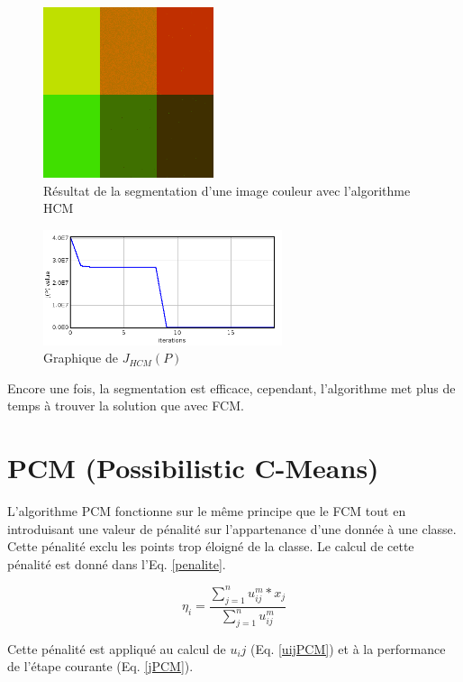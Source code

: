 \documentclass[a4paper,11pt]{article}
\begin{document}
\begin{figure}[!h]
  \begin{center}
    \includegraphics[width=5cm]{resultat/HCM.png}
    \caption{Résultat de la segmentation d'une image couleur avec l'algorithme HCM}
    \label{fig:hcm}
  \end{center}
\end{figure}

\begin{figure}[!h]
  \begin{center}
    \includegraphics[width=7cm]{resultat/HCM_graph.png}
    \caption{Graphique de $J_{HCM}(P)$}
    \label{fig:graphHCM}
  \end{center}
\end{figure}

Encore une fois, la segmentation est efficace, cependant, l'algorithme met plus de temps
à trouver la solution que avec FCM.
\newpage
\section{PCM (Possibilistic C-Means)}
L'algorithme PCM fonctionne sur le même principe que le FCM tout en introduisant une valeur de pénalité
sur l'appartenance d'une donnée à une classe. Cette pénalité exclu les points trop éloigné de la classe. 
Le calcul de cette pénalité est donné dans l'Eq. \ref{penalite}.

\begin{equation}
  \label{penalite}
  \eta_i = \frac{\sum_{j=1}^{n} u_{ij}^m * x_j}{\sum_{j=1}^{n} u_{ij}^m}
\end{equation}

Cette pénalité est appliqué au calcul de $u_ij$ (Eq. \ref{uijPCM}) et à la performance de l'étape courante (Eq. \ref{jPCM}).
\end{document}
